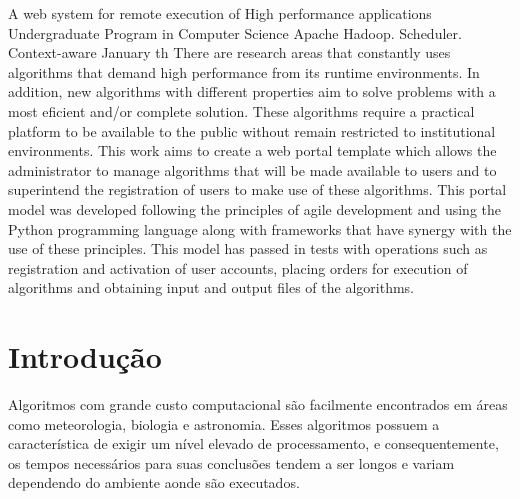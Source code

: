 \documentclass[tg]{mdtufsm}
\begin{document}
\begin{englishabstract}
	{A web system for remote execution of High performance applications}
	{Undergraduate Program in Computer Science}
	{Apache Hadoop. Scheduler. Context-aware}
	{January}
	{th}
There are research areas that constantly uses algorithms that demand high performance from its runtime environments. In addition, new algorithms with different properties aim to solve problems with a most eficient and/or complete solution. These algorithms require a practical platform to be available to the public without remain restricted to institutional environments. This work aims to create a web portal template which allows the administrator to manage algorithms that will be made available to users and to superintend the registration of users to make use of these algorithms. This portal model was developed following the principles of agile development and using the Python programming language along with frameworks that have synergy with the use of these principles. This model has passed in tests with operations such as registration and activation of user accounts, placing orders for execution of algorithms and obtaining input and output files of the algorithms.
	
\end{englishabstract}


\tableofcontents
\listoffigures

\setlength{\baselineskip}{1.5\baselineskip}


\chapter{Introdução}

Algoritmos com grande custo computacional são facilmente encontrados em áreas como meteorologia, biologia e astronomia. Esses algoritmos possuem a característica de exigir um nível elevado de processamento, e consequentemente, os tempos necessários para suas conclusões tendem a ser longos e variam dependendo do ambiente aonde são executados.
\end{document}
